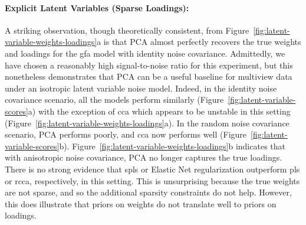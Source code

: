 \paragraph{Explicit Latent Variables (Sparse Loadings):} A striking observation, though theoretically consistent, from Figure~\ref{fig:latent-variable-weights-loadings}a is that PCA almost perfectly recovers the true \gls{weights} and loadings for the \acrshort{gfa} model with identity noise covariance.
Admittedly, we have chosen a reasonably high signal-to-noise ratio for this experiment, but this nonetheless demonstrates that PCA can be a useful baseline for multiview data under an isotropic latent variable noise model.
Indeed, in the identity noise covariance scenario, all the models perform similarly (Figure~\ref{fig:latent-variable-scores}a) with the exception of \acrshort{cca} which appears to be unstable in this setting (Figure~\ref{fig:latent-variable-weights-loadings}a).
In the random noise covariance scenario, PCA performs poorly, and \acrshort{cca} now performs well (Figure~\ref{fig:latent-variable-scores}b).
Figure~\ref{fig:latent-variable-weights-loadings}b indicates that with anisotropic noise covariance, PCA no longer captures the true loadings.
There is no strong evidence that \acrshort{spls} or Elastic Net regularization outperform \acrshort{pls} or \acrshort{rcca}, respectively, in this setting.
This is unsurprising because the true \gls{weights} are not sparse, and so the additional sparsity constraints do not help.
However, this does illustrate that priors on \gls{weights} do not translate well to priors on loadings.

